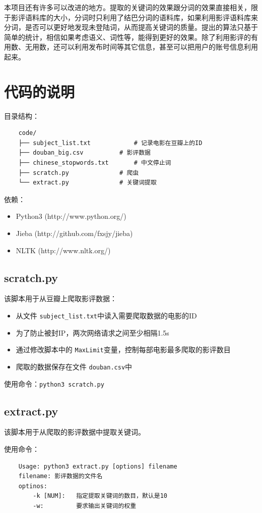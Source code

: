 \documentclass[a4paper, nofonts, nocap]{ctexart}
\begin{document}
本项目还有许多可以改进的地方。提取的关键词的效果跟分词的效果直接相关，限于影评语料库的大小，分词时只利用了结巴分词的语料库，如果利用影评语料库来分词，是否可以更好地发现未登陆词，从而提高关键词的质量。提出的算法只基于简单的统计，相信如果考虑语义、词性等，能得到更好的效果。除了利用影评的有用数、无用数，还可以利用发布时间等其它信息，甚至可以把用户的账号信息利用起来。

\appendix

\section{代码的说明}
目录结构：
\begin{lstlisting}
	code/
	├── subject_list.txt			# 记录电影在豆瓣上的ID
	├── douban_big.csv			# 影评数据
	├── chinese_stopwords.txt		# 中文停止词
	├── scratch.py				# 爬虫
	└── extract.py				# 关键词提取
\end{lstlisting}

依赖：
\begin{itemize}
	\setlength{\itemindent}{2em}
	\item Python3 (http://www.python.org/)
	\item Jieba (http://github.com/fxsjy/jieba)
	\item NLTK (http://www.nltk.org/)
\end{itemize}

\subsection{scratch.py}
该脚本用于从豆瓣上爬取影评数据：
\begin{itemize}
	\setlength{\itemindent}{2em}
	\item 从文件 \verb|subject_list.txt|中读入需要爬取数据的电影的ID
	\item 为了防止被封IP，两次网络请求之间至少相隔1.5s
	\item 通过修改脚本中的 \verb|MaxLimit|变量，控制每部电影最多爬取的影评数目
	\item 爬取的数据保存在文件 \verb|douban.csv|中
\end{itemize}

使用命令：\verb|python3 scratch.py|

\subsection{extract.py}
该脚本用于从爬取的影评数据中提取关键词。

使用命令：
\begin{lstlisting}
	Usage: python3 extract.py [options] filename
	filename: 影评数据的文件名
	optinos:
		-k [NUM]:	指定提取关键词的数目，默认是10
		-w:			要求输出关键词的权重
\end{lstlisting}
\end{document}
